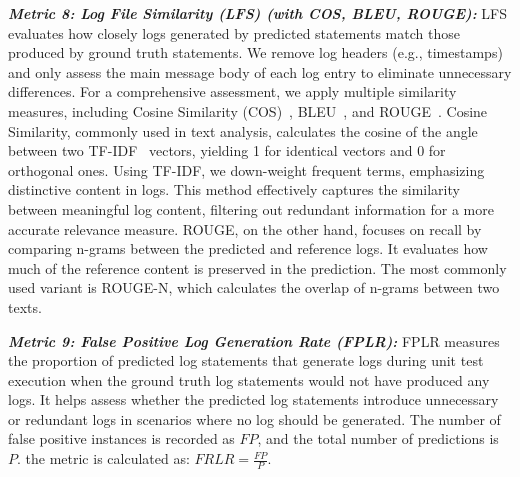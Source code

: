  \textit{\textbf{Metric 8: Log File Similarity (LFS) (with COS, BLEU, ROUGE):}}
 LFS evaluates how closely logs generated by predicted statements match those produced by ground truth statements.
 We remove log headers (e.g., timestamps) and only assess the main message body of each log entry to eliminate unnecessary differences.
 For a comprehensive assessment, we apply multiple similarity measures, including Cosine Similarity (COS)~\cite{Salton1975AVS}, BLEU~\cite{Papineni2002BleuAM}, and ROUGE~\cite{Lin2004ROUGEAP}. Cosine Similarity, commonly used in text analysis, calculates the cosine of the angle between two TF-IDF~\cite{SprckJones2021ASI} vectors, yielding 1 for identical vectors and 0 for orthogonal ones. Using TF-IDF, we down-weight frequent terms, emphasizing distinctive content in logs. This method effectively captures the similarity between meaningful log content, filtering out redundant information for a more accurate relevance measure.
ROUGE, on the other hand, focuses on recall by comparing n-grams between the predicted and reference logs. It evaluates how much of the reference content is preserved in the prediction. The most commonly used variant is ROUGE-N, which calculates the overlap of n-grams between two texts. 


 \textit{\textbf{Metric 9: False Positive Log Generation Rate (FPLR):}}
FPLR measures the proportion of predicted log statements that generate logs during unit test execution when the ground truth log statements would not have produced any logs. It helps assess whether the predicted log statements introduce unnecessary or redundant logs in scenarios where no log should be generated. The number of false positive instances is recorded as \(FP\), and the total number of predictions is \(P\). the metric is calculated as: \(FRLR=\frac{FP}{P}\).


